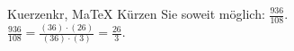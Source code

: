 \begin{MAufgabe}{Kuerzen}{kr, MaTeX}
K\"urzen Sie soweit m\"oglich: $\frac{936}{108}$.\\ 
\ifLsg\MLoesung
\quad $\frac{936}{108}=\frac{(36)\cdot(26)}{(36)\cdot(3)}=\frac{26}{3}$.\else\relax\fi
 \end{MAufgabe}